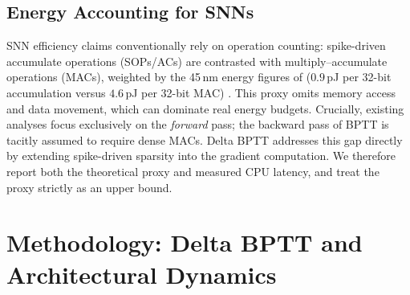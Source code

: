 \documentclass[10pt,a4paper,twoside]{article}
\begin{document}
\subsection{Energy Accounting for SNNs}
SNN efficiency claims conventionally rely on operation counting: spike-driven accumulate operations (SOPs/ACs) are contrasted with multiply--accumulate operations (MACs), weighted by the 45\,nm energy figures of \cite{horowitz2014computing} ($0.9$\,pJ per 32-bit accumulation versus $4.6$\,pJ per 32-bit MAC) \cite{zhou2023spikformer, fang2023spikingjelly}. This proxy omits memory access and data movement, which can dominate real energy budgets. Crucially, existing analyses focus exclusively on the \textit{forward} pass; the backward pass of BPTT is tacitly assumed to require dense MACs. Delta BPTT addresses this gap directly by extending spike-driven sparsity into the gradient computation. We therefore report both the theoretical proxy and measured CPU latency, and treat the proxy strictly as an upper bound.


\section{Methodology: Delta BPTT and Architectural Dynamics}
\end{document}
